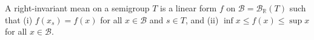 A right-invariant mean on a semigroup $T$ is a linear form $f$ on $\mathcal{B} = \mathcal{B}_{\mathbb{R}}(T)$ such that (i) $f(x_s) = f(x)$ for all $x \in \mathcal{B}$ and $s \in T$, and (ii) $\inf x \leq f(x) \leq \sup x$ for all $x \in \mathcal{B}$.